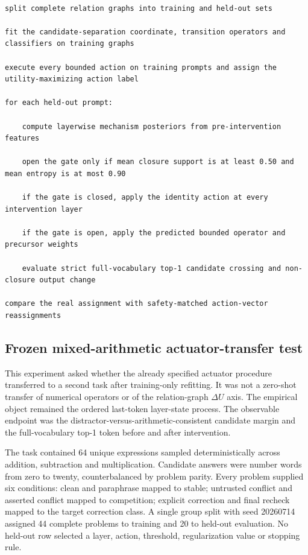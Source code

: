 \documentclass[10pt]{article}
\begin{document}
\begin{Verbatim}[fontsize=\small,breaklines=true,breakanywhere=true]

split complete relation graphs into training and held-out sets

fit the candidate-separation coordinate, transition operators and classifiers on training graphs

execute every bounded action on training prompts and assign the utility-maximizing action label

for each held-out prompt:

    compute layerwise mechanism posteriors from pre-intervention features

    open the gate only if mean closure support is at least 0.50 and mean entropy is at most 0.90

    if the gate is closed, apply the identity action at every intervention layer

    if the gate is open, apply the predicted bounded operator and precursor weights

    evaluate strict full-vocabulary top-1 candidate crossing and non-closure output change

compare the real assignment with safety-matched action-vector reassignments

\end{Verbatim}

\subsection*{Frozen mixed-arithmetic actuator-transfer test}

This experiment asked whether the already specified actuator procedure transferred to a second task after training-only refitting. It was not a zero-shot transfer of numerical operators or of the relation-graph \(\Delta U\) axis. The empirical object remained the ordered last-token layer-state process. The observable endpoint was the distractor-versus-arithmetic-consistent candidate margin and the full-vocabulary top-1 token before and after intervention.

The task contained 64 unique expressions sampled deterministically across addition, subtraction and multiplication. Candidate answers were number words from zero to twenty, counterbalanced by problem parity. Every problem supplied six conditions: clean and paraphrase mapped to stable; untrusted conflict and asserted conflict mapped to competition; explicit correction and final recheck mapped to the target correction class. A single group split with seed 20260714 assigned 44 complete problems to training and 20 to held-out evaluation. No held-out row selected a layer, action, threshold, regularization value or stopping rule.
\end{document}
